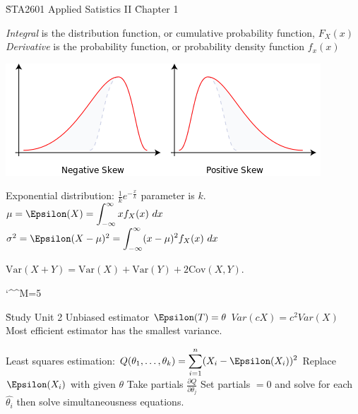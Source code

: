 \documentclass{examnotes}
\def\disobeylines{\catcode`\^^M=5 }
\begin{document}
\obeylines
\setlength\baselineskip{15pt}
\h{STA2601 Applied Satistics II}
\h{Chapter 1}

{\it Integral} is the distribution function, or cumulative probability function,  $F_X(x)$ \\
{\it Derivative} is the probability function, or probability density function $f_x(x)$

\includegraphics[scale=0.6]{./img/skewness.png}

Exponential distribution: $\displaystyle\frac{1}{k}e^{-\displaystyle\frac{x}{k}}$ parameter is $k$.
\vspace{6pt}
$\mu=\Epsilon(X)=\displaystyle\int_{-\infty}^\infty xf_X(x)\ dx$
\vspace{6pt}
$\sigma^2=\Epsilon(X-\mu)^2=\displaystyle\int_{-\infty}^\infty (x-\mu)^2f_X(x)\ dx$
\vspace{6pt}

$\text{Var}(X+Y) =\text{Var}(X)+\text{Var}(Y)+2\text{Cov}(X,Y).$
\vspace{6pt}


\disobeylines
{} %

\obeylines
\h{Study Unit 2}
\ra Unbiased estimator ${\Epsilon(T)=\theta}$ 
\ra $Var(cX)=c^2Var(X)$
\ra Most efficient estimator has the smallest variance. 

Least squares estimation:      
 ${Q(\theta_1,\dots,\theta_k)= \displaystyle\sum_{i=1}^n(X_i-\Epsilon(X_i))^2}$
\vspace{6pt}
 Replace $\Epsilon(X_i)$ with given ${\theta}$
\vspace{6pt}
 Take partials ${\displaystyle\frac{\partial Q}{\partial \theta_j}}$ 
\vspace{6pt}
 Set partials ${=0}$ and solve for each ${\hat{\theta_i}}$ then solve simultaneousness equations.
\end{document}
